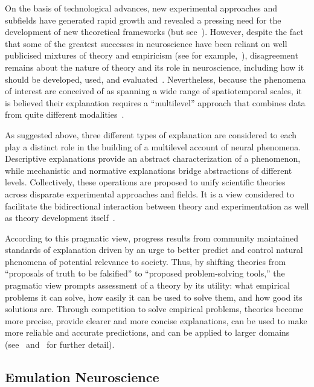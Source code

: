 \documentclass[10pt,letterpaper]{article}
\begin{document}
On the basis of technological advances, new experimental approaches and subfields have generated rapid growth and revealed a pressing need for the development of new theoretical frameworks (but see~\cite{phillips15}). However, despite the fact that some of the greatest successes in neuroscience have been reliant on well publicised mixtures of theory and empiricism (see for example,~\cite{hodgkin52e,okeefe78,traub91,marr10,vaina91}), disagreement remains about the nature of theory and its role in neuroscience, including how it should be developed, used, and evaluated~\cite{bialek18,goldstein18}. Nevertheless, because the phenomena of interest are conceived of as spanning a wide range of spatiotemporal scales, it is believed their explanation requires a “multilevel” approach that combines data from quite different modalities~\cite{levenstein23}.

As suggested above, three different types of explanation are considered to each play a distinct role in the building of a multilevel account of neural phenomena. Descriptive explanations provide an abstract characterization of a phenomenon, while mechanistic and normative explanations bridge abstractions of different levels. Collectively, these operations are proposed to unify scientific theories across disparate experimental approaches and fields. It is a view considered to facilitate the bidirectional interaction between theory and experimentation as well as theory development itself~\cite{levenstein23}.

According to this pragmatic view, progress results from community maintained standards of explanation driven by an urge to better predict and control natural phenomena of potential relevance to society. Thus, by shifting theories from “proposals of truth to be falsified” to “proposed problem-solving tools,” the pragmatic view prompts assessment of a theory by its utility: what empirical problems it can solve, how easily it can be used to solve them, and how good its solutions are. Through competition to solve empirical problems, theories become more precise, provide clearer and more concise explanations, can be used to make more reliable and accurate predictions, and can be applied to larger domains (see~\cite{levenstein23} and~\cite{douglas14} for further detail). 

\subsection*{Emulation Neuroscience}
\label{subsection:emuneuro}
\end{document}
